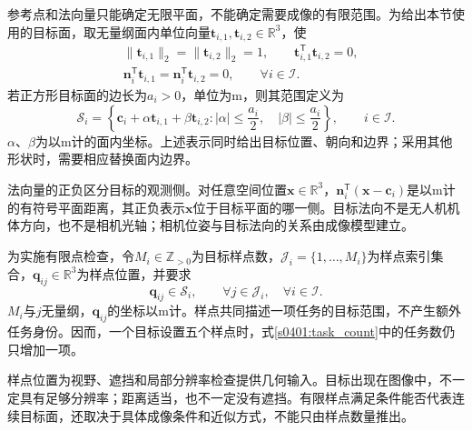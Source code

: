 参考点和法向量只能确定无限平面，不能确定需要成像的有限范围。为给出本节使用的目标面，取无量纲面内单位向量$\mathbf t_{i,1},\mathbf t_{i,2}\in\mathbb R^3$，使
\begin{equation}
 \begin{aligned}
 &\|\mathbf t_{i,1}\|_2=\|\mathbf t_{i,2}\|_2=1,
 \qquad \mathbf t_{i,1}^{\mathsf T}\mathbf t_{i,2}=0,\\
 &\mathbf n_i^{\mathsf T}\mathbf t_{i,1}
 =\mathbf n_i^{\mathsf T}\mathbf t_{i,2}=0,
 \qquad \forall i\in\mathcal I.
 \end{aligned}
\end{equation}
若正方形目标面的边长为$a_i>0$，单位为$\mathrm m$，则其范围定义为
\begin{equation}
 \mathcal S_i=
 \left\{\mathbf c_i+\alpha\mathbf t_{i,1}+\beta\mathbf t_{i,2}:
 |\alpha|\leq\frac{a_i}{2},\quad
 |\beta|\leq\frac{a_i}{2}\right\},
 \qquad i\in\mathcal I.
\end{equation}
$\alpha$、$\beta$为以$\mathrm m$计的面内坐标。上述表示同时给出目标位置、朝向和边界；采用其他形状时，需要相应替换面内边界。

法向量的正负区分目标的观测侧。对任意空间位置$\mathbf x\in\mathbb R^3$，$\mathbf n_i^{\mathsf T}(\mathbf x-\mathbf c_i)$是以$\mathrm m$计的有符号平面距离，其正负表示$\mathbf x$位于目标平面的哪一侧。目标法向不是无人机机体方向，也不是相机光轴；相机位姿与目标法向的关系由成像模型建立。

为实施有限点检查，令$M_i\in\mathbb Z_{>0}$为目标样点数，$\mathcal J_i=\{1,\ldots,M_i\}$为样点索引集合，$\mathbf q_{ij}\in\mathbb R^3$为样点位置，并要求
\begin{equation}
 \mathbf q_{ij}\in\mathcal S_i,
 \qquad \forall j\in\mathcal J_i,\quad\forall i\in\mathcal I.
 \label{s0401:target_samples}
\end{equation}
$M_i$与$j$无量纲，$\mathbf q_{ij}$的坐标以$\mathrm m$计。样点共同描述一项任务的目标范围，不产生额外任务身份。因而，一个目标设置五个样点时，式\eqref{s0401:task_count}中的任务数仍只增加一项。

样点位置为视野、遮挡和局部分辨率检查提供几何输入。目标出现在图像中，不一定具有足够分辨率；距离适当，也不一定没有遮挡。有限样点满足条件能否代表连续目标面，还取决于具体成像条件和近似方式，不能只由样点数量推出。

